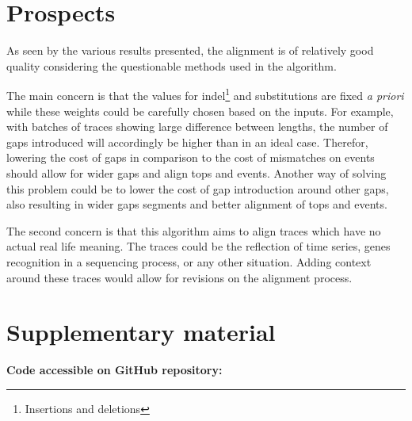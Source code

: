 \documentclass[12pt,a4paper]{article}
\begin{document}


\section{Prospects}

As seen by the various results presented, the alignment is of relatively good quality considering the questionable methods used in the algorithm.

The main concern is that the values for indel\footnote{Insertions and deletions} and substitutions are fixed \emph{a priori} while these weights could be carefully chosen based on the inputs.
For example, with batches of traces showing large difference between lengths, the number of gaps introduced will accordingly be higher than in an ideal case.
Therefor, lowering the cost of gaps in comparison to the cost of mismatches on events should allow for wider gaps and align tops and events.
Another way of solving this problem could be to lower the cost of gap introduction around other gaps, also resulting in wider gaps segments and better alignment of tops and events.

The second concern is that this algorithm aims to align traces which have no actual real life meaning.
The traces could be the reflection of time series, genes recognition in a sequencing process, or any other situation.
Adding context around these traces would allow for revisions on the alignment process.

\pagebreak




\section*{Supplementary material}

\noindent\footnotesize{\textbf{Code accessible on GitHub repository:}
\href{https://github.com/Damien-Garcia-Bioinformatics/aap\_mma\_project}{\color{blue}{https://github.com/Damien-Garcia-Bioinformatics/aap\_mma\_project}}}
\end{document}
